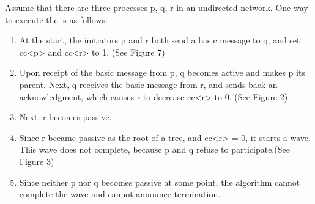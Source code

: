 \documentclass[letterpaper,10pt,english]{sphinxmanual}
\begin{document}
\sphinxAtStartPar
Assume that there are three processes p, q, r in an undirected network. One way to execute the {\hyperref[\detokenize{docs/ShavitFrancez/algorithm:shavitfrancezterminationdetectionalgorithm}]{}} is as follows:
\begin{enumerate}
%
\item {} 
\sphinxAtStartPar
At the start, the initiators p and r both send a basic message to q, and set cc\textless{}p\textgreater{} and cc\textless{}r\textgreater{} to 1. (See Figure 7)

\item {} 
\sphinxAtStartPar
Upon receipt of the basic message from p, q becomes active and makes p its parent. Next, q receives the basic message from r, and sends back an acknowledgment, which causes r to decrease cc\textless{}r\textgreater{} to 0. (See Figure 2)

\item {} 
\sphinxAtStartPar
Next, r becomes passive.

\item {} 
\sphinxAtStartPar
Since r became passive as the root of a tree, and cc\textless{}r\textgreater{} = 0, it starts a wave. This wave does not complete, because p and q refuse to participate.(See Figure 3)

\item {} 
\sphinxAtStartPar
Since neither p nor q becomes passive at some point, the algorithm cannot complete the wave and cannot announce termination.

\end{enumerate}
\end{document}
